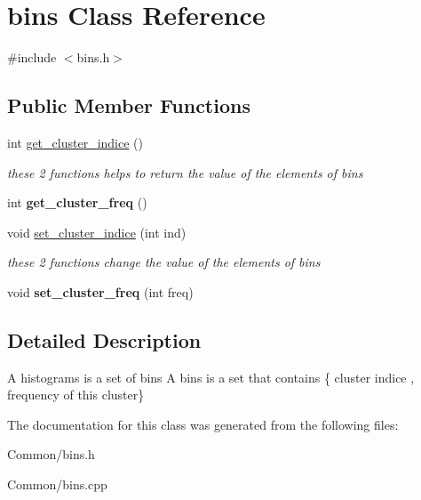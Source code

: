 \hypertarget{classbins}{
\section{bins Class Reference}
\label{classbins}
}


{\ttfamily \#include $<$bins.h$>$}

\subsection*{Public Member Functions}
\begin{DoxyCompactItemize}
\item 
\hypertarget{classbins_a68bd920be639e0bf324c701d019269f2}{
int \hyperlink{classbins_a68bd920be639e0bf324c701d019269f2}{get\_\-cluster\_\-indice} ()}
\label{classbins_a68bd920be639e0bf324c701d019269f2}

\begin{DoxyCompactList}\small\item\em these 2 functions helps to return the value of the elements of bins \end{DoxyCompactList}\item 
\hypertarget{classbins_a070fc8a3aeb711028e771f3d9543b0b2}{
int {\bfseries get\_\-cluster\_\-freq} ()}
\label{classbins_a070fc8a3aeb711028e771f3d9543b0b2}

\item 
\hypertarget{classbins_ac3d49ee14d2173e5901b2e58766ec4a7}{
void \hyperlink{classbins_ac3d49ee14d2173e5901b2e58766ec4a7}{set\_\-cluster\_\-indice} (int ind)}
\label{classbins_ac3d49ee14d2173e5901b2e58766ec4a7}

\begin{DoxyCompactList}\small\item\em these 2 functions change the value of the elements of bins \end{DoxyCompactList}\item 
\hypertarget{classbins_a70ce2c539a0023a88b7016d9f7153a43}{
void {\bfseries set\_\-cluster\_\-freq} (int freq)}
\label{classbins_a70ce2c539a0023a88b7016d9f7153a43}

\end{DoxyCompactItemize}


\subsection{Detailed Description}
A histograms is a set of bins A bins is a set that contains \{ cluster indice , frequency of this cluster\} 

The documentation for this class was generated from the following files:\begin{DoxyCompactItemize}
\item 
Common/bins.h\item 
Common/bins.cpp\end{DoxyCompactItemize}
